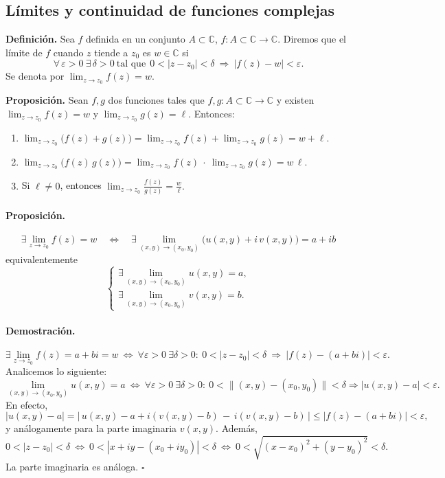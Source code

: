 \documentclass[a4paper,12pt]{article}
\begin{document}
\subsection{Límites y continuidad de funciones complejas}

\textbf{Definición.} Sea $f$ definida en un conjunto $A\subset\mathbb{C}$, $f:A\subset\mathbb{C}\to\mathbb{C}$. Diremos que el límite de $f$ cuando $z$ tiende a $z_0$ es $w\in\mathbb{C}$ si
\[
\forall\,\varepsilon>0\ \exists\,\delta>0\ \text{tal que}\ \ 0<|z-z_0|<\delta \ \Rightarrow\ |f(z)-w|<\varepsilon.
\]
Se denota por \(\displaystyle \lim_{z\to z_0} f(z)=w\).

\medskip

\textbf{Proposición.} Sean $f,g$ dos funciones tales que $f,g:A\subset\mathbb{C}\to\mathbb{C}$ y existen
\(\displaystyle \lim_{z\to z_0} f(z)=w\) y \(\displaystyle \lim_{z\to z_0} g(z)=\ell\). Entonces:
\begin{enumerate}
  \item \(\displaystyle \lim_{z\to z_0} \big(f(z)+g(z)\big)
  = \lim_{z\to z_0} f(z) + \lim_{z\to z_0} g(z) = w+\ell.\)
  \item \(\displaystyle \lim_{z\to z_0} \big(f(z)\,g(z)\big)
  = \lim_{z\to z_0} f(z)\ \cdot\ \lim_{z\to z_0} g(z) = w\,\ell.\)
  \item Si \(\ell\neq 0\), entonces \(\displaystyle
  \lim_{z\to z_0} \frac{f(z)}{g(z)} = \frac{w}{\ell}.\)
\end{enumerate}

\paragraph{Proposición.}
\[
\exists \lim_{z\to z_0} f(z)=w \quad\Longleftrightarrow\quad
\exists \lim_{(x,y)\to(x_0,y_0)} \bigl(u(x,y)+i\,v(x,y)\bigr)=a+ib
\]
equivalentemente
\[
\begin{cases}
\displaystyle \exists \lim_{(x,y)\to(x_0,y_0)} u(x,y)=a,\\[4pt]
\displaystyle \exists \lim_{(x,y)\to(x_0,y_0)} v(x,y)=b.
\end{cases}
\]

\paragraph{Demostración.}
\[
\exists \lim_{z\to z_0} f(z)=a+bi=w
\ \Longleftrightarrow\
\forall \varepsilon>0\ \exists \delta>0:\ 0<|z-z_0|<\delta \ \Rightarrow\ |f(z)-(a+bi)|<\varepsilon .
\]
Analicemos lo siguiente:
\[
\lim_{(x,y)\to(x_0,y_0)} u(x,y)=a
\ \Longleftrightarrow\
\forall \varepsilon>0\ \exists \delta>0:\ 0<\| (x,y)-(x_0,y_0)\|<\delta \Rightarrow |u(x,y)-a|<\varepsilon .
\]
En efecto,
\[
|u(x,y)-a|
=\bigl|\,u(x,y)-a+i(v(x,y)-b)\,-\,i(v(x,y)-b)\,\bigr|
\le |f(z)-(a+bi)|
<\varepsilon,
\]
y análogamente para la parte imaginaria \(v(x,y)\).
Además,
\[
0<|z-z_0|<\delta
\ \Longleftrightarrow\
0<|x+iy-(x_0+iy_0)|<\delta
\ \Longleftrightarrow\
0<\sqrt{(x-x_0)^2+(y-y_0)^2}<\delta .
\]
La parte imaginaria es análoga. \(\square\)
\end{document}
